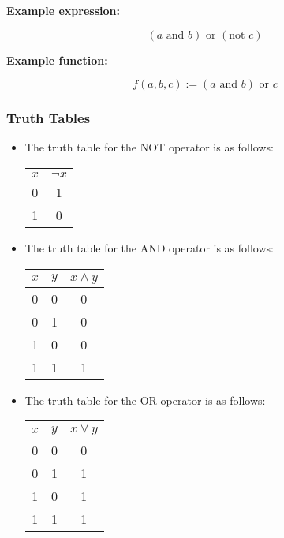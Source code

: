 \documentclass[12pt]{article}
\begin{document}
\textbf{Example expression:}

\begin{equation*}
(a \text{ and } b) \text{ or } (\text{not } c)
\end{equation*}

\noindent \textbf{Example function:}

\begin{equation*}
f(a, b, c) := (a \text{ and } b) \text{ or } c
\end{equation*}

\subsubsection{Truth Tables}

\begin{itemize}
    \item The truth table for the NOT operator is as follows:

    \begin{center}
    \begin{tabular}{c|c}
    \hline
    $x$ & $\lnot x$ \\
    \hline
    0 & 1 \\
    1 & 0 \\
    \hline
    \end{tabular}
    \end{center}

    \item The truth table for the AND operator is as follows:

    \begin{center}
    \begin{tabular}{cc|c}
    \hline
    $x$ & $y$ & $x \land y$ \\
    \hline
    0 & 0 & 0 \\
    0 & 1 & 0 \\
    1 & 0 & 0 \\
    1 & 1 & 1 \\
    \hline
    \end{tabular}
    \end{center}

    \item The truth table for the OR operator is as follows:

    \begin{center}
    \begin{tabular}{cc|c}
    \hline
    $x$ & $y$ & $x \lor y$ \\
    \hline
    0 & 0 & 0 \\
    0 & 1 & 1 \\
    1 & 0 & 1 \\
    1 & 1 & 1 \\
    \hline
    \end{tabular}
    \end{center}
\end{itemize}
\end{document}
